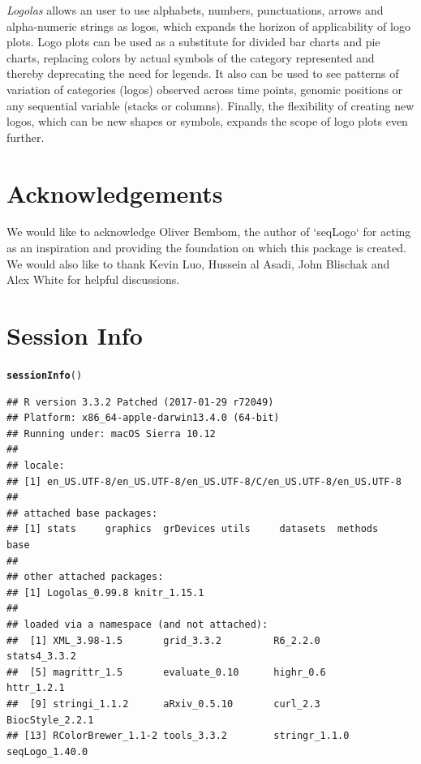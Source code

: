 \documentclass[12pt]{article}\usepackage[]{graphicx}\usepackage[usenames,dvipsnames]{color}
\makeatletter
\newcommand{\hlstd}[1]{\textcolor[rgb]{0.345,0.345,0.345}{#1}}%
\newcommand{\hlkwd}[1]{\textcolor[rgb]{0.737,0.353,0.396}{\textbf{#1}}}%
\newenvironment{kframe}{%
 \def\at@end@of@kframe{}%
 \ifinner\ifhmode%
  \def\at@end@of@kframe{\end{minipage}}%
  \begin{minipage}{\columnwidth}%
 \fi\fi%
 \def\FrameCommand##1{\hskip\@totalleftmargin \hskip-\fboxsep
 \colorbox{shadecolor}{##1}\hskip-\fboxsep
     \hskip-\linewidth \hskip-\@totalleftmargin \hskip\columnwidth}%
 \MakeFramed {\advance\hsize-\width
   \@totalleftmargin\z@ \linewidth\hsize
   \@setminipage}}%
 {\par\unskip\endMakeFramed%
 \at@end@of@kframe}
\newenvironment{knitrout}{}{} %
\newcommand{\Logolas}{\textit{Logolas}}
\makeatother
\begin{document}
\Logolas{} allows an user to use alphabets, numbers, punctuations, arrows and alpha-numeric strings as logos, which expands the horizon of applicability of logo plots. Logo plots can be used as a substitute for divided bar charts and pie charts, replacing colors by actual symbols of the category represented and thereby deprecating the need for legends. It also can be used to see patterns of variation of categories (logos) observed across time points, genomic positions or any sequential variable (stacks or columns). Finally, the flexibility of creating new logos, which can be new shapes or symbols, expands the scope of logo plots even further.

\section{Acknowledgements}

We would like to acknowledge Oliver Bembom, the author of `seqLogo` for acting as an inspiration and providing the foundation on which this package is created. We would also like to thank Kevin Luo, Hussein al Asadi, John Blischak and Alex White
for helpful discussions.

\section{Session Info}

\begin{knitrout}
\color{fgcolor}\begin{kframe}
\begin{alltt}
\hlkwd{sessionInfo}\hlstd{()}
\end{alltt}
\begin{verbatim}
## R version 3.3.2 Patched (2017-01-29 r72049)
## Platform: x86_64-apple-darwin13.4.0 (64-bit)
## Running under: macOS Sierra 10.12
## 
## locale:
## [1] en_US.UTF-8/en_US.UTF-8/en_US.UTF-8/C/en_US.UTF-8/en_US.UTF-8
## 
## attached base packages:
## [1] stats     graphics  grDevices utils     datasets  methods   base     
## 
## other attached packages:
## [1] Logolas_0.99.8 knitr_1.15.1  
## 
## loaded via a namespace (and not attached):
##  [1] XML_3.98-1.5       grid_3.3.2         R6_2.2.0           stats4_3.3.2      
##  [5] magrittr_1.5       evaluate_0.10      highr_0.6          httr_1.2.1        
##  [9] stringi_1.1.2      aRxiv_0.5.10       curl_2.3           BiocStyle_2.2.1   
## [13] RColorBrewer_1.1-2 tools_3.3.2        stringr_1.1.0      seqLogo_1.40.0
\end{verbatim}
\end{kframe}
\end{knitrout}
\end{document}
